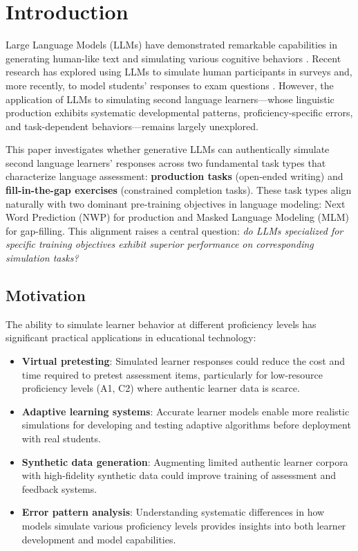 \section{Introduction}

Large Language Models (LLMs) have demonstrated remarkable capabilities in generating human-like text and simulating various cognitive behaviors \cite{openai2023gpt4}. Recent research has explored using LLMs to simulate human participants in surveys \cite{argyle2023out} and, more recently, to model students' responses to exam questions \cite{benedetto2024using}. However, the application of LLMs to simulating second language learners—whose linguistic production exhibits systematic developmental patterns, proficiency-specific errors, and task-dependent behaviors—remains largely unexplored.

This paper investigates whether generative LLMs can authentically simulate second language learners' responses across two fundamental task types that characterize language assessment: \textbf{production tasks} (open-ended writing) and \textbf{fill-in-the-gap exercises} (constrained completion tasks). These task types align naturally with two dominant pre-training objectives in language modeling: Next Word Prediction (NWP) for production and Masked Language Modeling (MLM) for gap-filling. This alignment raises a central question: \textit{do LLMs specialized for specific training objectives exhibit superior performance on corresponding simulation tasks?}

\subsection{Motivation}

The ability to simulate learner behavior at different proficiency levels has significant practical applications in educational technology:

\begin{itemize}
    \item \textbf{Virtual pretesting}: Simulated learner responses could reduce the cost and time required to pretest assessment items, particularly for low-resource proficiency levels (A1, C2) where authentic learner data is scarce.
    \item \textbf{Adaptive learning systems}: Accurate learner models enable more realistic simulations for developing and testing adaptive algorithms before deployment with real students.
    \item \textbf{Synthetic data generation}: Augmenting limited authentic learner corpora with high-fidelity synthetic data could improve training of assessment and feedback systems.
    \item \textbf{Error pattern analysis}: Understanding systematic differences in how models simulate various proficiency levels provides insights into both learner development and model capabilities.
\end{itemize}

